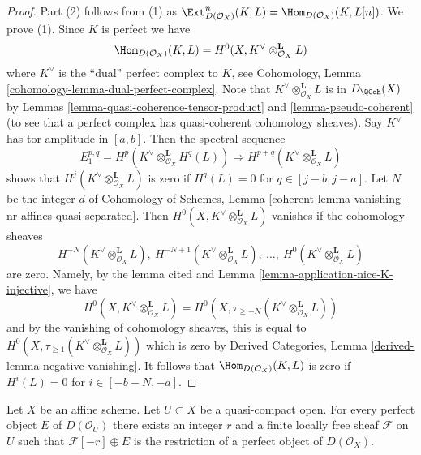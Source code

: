 \begin{proof}
Part (2) follows from (1) as $\Ext^n_{D(\mathcal{O}_X)}(K, L) =
\Hom_{D(\mathcal{O}_X)}(K, L[n])$. We prove (1).
Since $K$ is perfect we have
$$
\Hom_{D(\mathcal{O}_X)}(K, L) =
H^0(X, K^\vee \otimes_{\mathcal{O}_X}^\mathbf{L} L)
$$
where $K^\vee$ is the ``dual'' perfect complex to $K$, see
Cohomology, Lemma \ref{cohomology-lemma-dual-perfect-complex}.
Note that $K^\vee \otimes_{\mathcal{O}_X}^\mathbf{L} L$
is in $D_\QCoh(X)$ by
Lemmas \ref{lemma-quasi-coherence-tensor-product} and
\ref{lemma-pseudo-coherent} (to see that a perfect complex
has quasi-coherent cohomology sheaves). Say $K^\vee$ has
tor amplitude in $[a, b]$. Then the spectral sequence
$$
E_1^{p, q} = H^p(K^\vee \otimes_{\mathcal{O}_X}^\mathbf{L} H^q(L))
\Rightarrow
H^{p + q}(K^\vee \otimes_{\mathcal{O}_X}^\mathbf{L} L)
$$
shows that $H^j(K^\vee \otimes_{\mathcal{O}_X}^\mathbf{L} L)$
is zero if $H^q(L) = 0$ for $q \in [j - b, j - a]$.
Let $N$ be the integer $d$ of Cohomology of Schemes,
Lemma \ref{coherent-lemma-vanishing-nr-affines-quasi-separated}.
Then $H^0(X, K^\vee \otimes_{\mathcal{O}_X}^\mathbf{L} L)$
vanishes if the cohomology sheaves
$$
H^{-N}(K^\vee \otimes_{\mathcal{O}_X}^\mathbf{L} L),
\ H^{-N + 1}(K^\vee \otimes_{\mathcal{O}_X}^\mathbf{L} L),
\ \ldots,
\ H^0(K^\vee \otimes_{\mathcal{O}_X}^\mathbf{L} L)
$$
are zero. Namely, by the lemma cited and
Lemma \ref{lemma-application-nice-K-injective}, we have
$$
H^0(X, K^\vee \otimes_{\mathcal{O}_X}^\mathbf{L} L) =
H^0(X, \tau_{\geq -N}(K^\vee \otimes_{\mathcal{O}_X}^\mathbf{L} L))
$$
and by the vanishing of cohomology sheaves, this is equal to
$H^0(X, \tau_{\geq 1}(K^\vee \otimes_{\mathcal{O}_X}^\mathbf{L} L))$
which is zero by Derived Categories, Lemma
\ref{derived-lemma-negative-vanishing}.
It follows that $\Hom_{D(\mathcal{O}_X)}(K, L)$ is zero if
$H^i(L) = 0$ for $i \in [-b - N, -a]$.
\end{proof}

\begin{lemma}
\label{lemma-lift-perfect-complex-plus-locally-free}
Let $X$ be an affine scheme. Let $U \subset X$ be a quasi-compact open.
For every perfect object $E$ of $D(\mathcal{O}_U)$ there exists an integer
$r$ and a finite locally free sheaf $\mathcal{F}$ on $U$ such that
$\mathcal{F}[-r] \oplus E$ is the restriction of a perfect object of
$D(\mathcal{O}_X)$.
\end{lemma}

